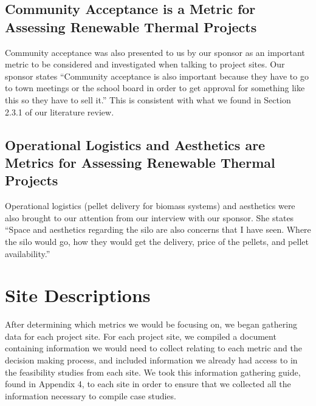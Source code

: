 \subsection{Community Acceptance is a Metric for Assessing Renewable Thermal Projects}
\par Community acceptance was also presented to us by our sponsor as an important metric to be considered and investigated when talking to project sites. Our sponsor states “Community acceptance is also important because they have to go to town meetings or the school board in order to get approval for something like this so they have to sell it.” This is consistent with what we found in Section 2.3.1 of our literature review.

\subsection{Operational Logistics and Aesthetics are Metrics for Assessing Renewable Thermal Projects}
\par Operational logistics (pellet delivery for biomass systems) and aesthetics were also brought to our attention from our interview with our sponsor. She states “Space and aesthetics regarding the silo are also concerns that I have seen. Where the silo would go, how they would get the delivery, price of the pellets, and pellet availability.”

\section{Site Descriptions}
\par After determining which metrics we would be focusing on, we began gathering data for each project site. For each project site, we compiled a document containing information we would need to collect relating to each metric and the decision making process, and included information we already had access to in the feasibility studies from each site. We took this information gathering guide, found in Appendix 4, to each site in order to ensure that we collected all the information necessary to compile case studies.

